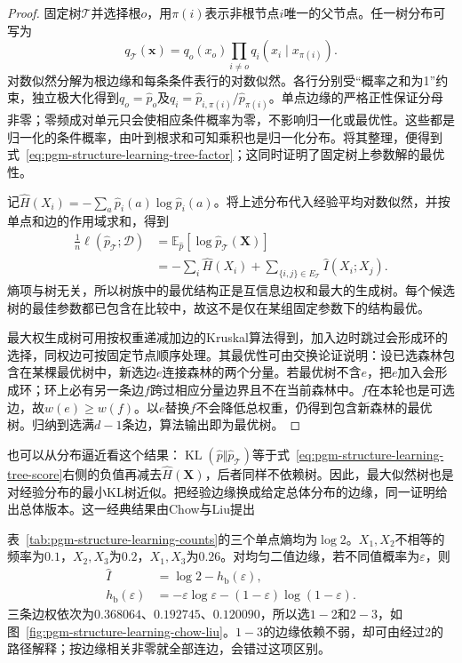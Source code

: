 \begin{proof}
  固定树$\mathcal{T}$并选择根$o$，用$\pi(i)$表示非根节点$i$唯一的父节点。任一树分布可写为
  \[
    q_{\mathcal{T}}(\bm{x})
    =q_o(x_o)\prod_{i\ne o}q_i(x_i\mid x_{\pi(i)}).
  \]
  对数似然分解为根边缘和每条条件表行的对数似然。各行分别受“概率之和为1”约束，独立极大化得到$q_o=\widehat p_o$及$q_i=\widehat p_{i,\pi(i)}/\widehat p_{\pi(i)}$。单点边缘的严格正性保证分母非零；零频成对单元只会使相应条件概率为零，不影响归一化或最优性。这些都是归一化的条件概率，由叶到根求和可知乘积也是归一化分布。将其整理，便得到式~\eqref{eq:pgm-structure-learning-tree-factor}；这同时证明了固定树上参数解的最优性。

  记$\widehat H(X_i)=-\sum_a\widehat p_i(a)\log\widehat p_i(a)$。将上述分布代入经验平均对数似然，并按单点和边的作用域求和，得到
  \begin{equation}
    \begin{aligned}
      \frac1n\ell(\widehat p_{\mathcal{T}};\mathcal{D})
      &=\mathbb{E}_{\widehat p}
          [\log\widehat p_{\mathcal{T}}(\bm{X})]\\
      &=-\sum_i\widehat H(X_i)
        +\sum_{\{i,j\}\in E_{\mathcal{T}}}
           \widehat I(X_i;X_j).
    \end{aligned}
    \label{eq:pgm-structure-learning-tree-score}
  \end{equation}
  熵项与树无关，所以树族中的最优结构正是互信息边权和最大的生成树。每个候选树的最佳参数都已包含在比较中，故这不是仅在某组固定参数下的结构最优。

  最大权生成树可用按权重递减加边的Kruskal算法得到，加入边时跳过会形成环的选择，同权边可按固定节点顺序处理。其最优性可由交换论证说明：设已选森林包含在某棵最优树中，新选边$e$连接森林的两个分量。若最优树不含$e$，把$e$加入会形成环；环上必有另一条边$f$跨过相应分量边界且不在当前森林中。$f$在本轮也是可选边，故$w(e)\geq w(f)$。以$e$替换$f$不会降低总权重，仍得到包含新森林的最优树。归纳到选满$d-1$条边，算法输出即为最优树。
\end{proof}

也可以从分布逼近看这个结果：$\operatorname{KL}(\widehat p\Vert\widehat p_{\mathcal{T}})$等于式~\eqref{eq:pgm-structure-learning-tree-score}右侧的负值再减去$\widehat H(\bm{X})$，后者同样不依赖树。因此，最大似然树也是对经验分布的最小KL树近似。把经验边缘换成给定总体分布的边缘，同一证明给出总体版本。这一经典结果由Chow与Liu提出

表~\ref{tab:pgm-structure-learning-counts}的三个单点熵均为$\log2$。$X_1,X_2$不相等的频率为$0.1$，$X_2,X_3$为$0.2$，$X_1,X_3$为$0.26$。对均匀二值边缘，若不同值概率为$\varepsilon$，则
\[
  \begin{aligned}
    \widehat I&=\log2-h_{\mathrm b}(\varepsilon),\\
    h_{\mathrm b}(\varepsilon)
      &=-\varepsilon\log\varepsilon
        -(1-\varepsilon)\log(1-\varepsilon).
  \end{aligned}
\]
三条边权依次为$0.368064$、$0.192745$、$0.120090$，所以选$1-2$和$2-3$，如图~\ref{fig:pgm-structure-learning-chow-liu}。$1-3$的边缘依赖不弱，却可由经过$2$的路径解释；按边缘相关非零就全部连边，会错过这项区别。

